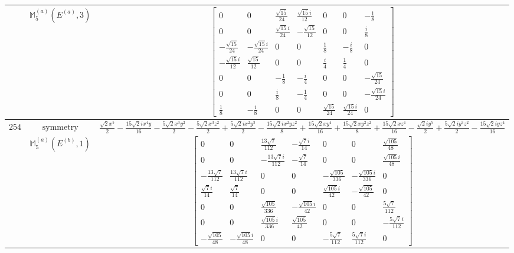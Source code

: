 \documentclass[fleqn,8pt,landscape]{jsarticle}
\begin{document}
\begin{longtable}{ccc}
$  $ & $ \mathbb{M}_{5}^{(a)}(E^{(a)},3) $ & $ \begin{bmatrix} 0 & 0 & \frac{\sqrt{15}}{24} & \frac{\sqrt{15} i}{12} & 0 & 0 & - \frac{1}{8} \\ 0 & 0 & \frac{\sqrt{15} i}{24} & - \frac{\sqrt{15}}{12} & 0 & 0 & \frac{i}{8} \\ - \frac{\sqrt{15}}{24} & - \frac{\sqrt{15} i}{24} & 0 & 0 & \frac{1}{8} & - \frac{i}{8} & 0 \\ - \frac{\sqrt{15} i}{12} & \frac{\sqrt{15}}{12} & 0 & 0 & \frac{i}{4} & \frac{1}{4} & 0 \\ 0 & 0 & - \frac{1}{8} & - \frac{i}{4} & 0 & 0 & - \frac{\sqrt{15}}{24} \\ 0 & 0 & \frac{i}{8} & - \frac{1}{4} & 0 & 0 & - \frac{\sqrt{15} i}{24} \\ \frac{1}{8} & - \frac{i}{8} & 0 & 0 & \frac{\sqrt{15}}{24} & \frac{\sqrt{15} i}{24} & 0 \end{bmatrix} $ \\ \hline
$ 254 $ & $ \text{symmetry} $ & $ \frac{\sqrt{2} x^{5}}{2} - \frac{15 \sqrt{2} i x^{4} y}{16} - \frac{5 \sqrt{2} x^{3} y^{2}}{2} - \frac{5 \sqrt{2} x^{3} z^{2}}{2} + \frac{5 \sqrt{2} i x^{2} y^{3}}{2} - \frac{15 \sqrt{2} i x^{2} y z^{2}}{8} + \frac{15 \sqrt{2} x y^{4}}{16} + \frac{15 \sqrt{2} x y^{2} z^{2}}{8} + \frac{15 \sqrt{2} x z^{4}}{16} - \frac{\sqrt{2} i y^{5}}{2} + \frac{5 \sqrt{2} i y^{3} z^{2}}{2} - \frac{15 \sqrt{2} i y z^{4}}{16} $ \\
$  $ & $ \mathbb{M}_{5}^{(a)}(E^{(b)},1) $ & $ \begin{bmatrix} 0 & 0 & \frac{13 \sqrt{7}}{112} & - \frac{\sqrt{7} i}{14} & 0 & 0 & \frac{\sqrt{105}}{48} \\ 0 & 0 & - \frac{13 \sqrt{7} i}{112} & - \frac{\sqrt{7}}{14} & 0 & 0 & \frac{\sqrt{105} i}{48} \\ - \frac{13 \sqrt{7}}{112} & \frac{13 \sqrt{7} i}{112} & 0 & 0 & - \frac{\sqrt{105}}{336} & - \frac{\sqrt{105} i}{336} & 0 \\ \frac{\sqrt{7} i}{14} & \frac{\sqrt{7}}{14} & 0 & 0 & \frac{\sqrt{105} i}{42} & - \frac{\sqrt{105}}{42} & 0 \\ 0 & 0 & \frac{\sqrt{105}}{336} & - \frac{\sqrt{105} i}{42} & 0 & 0 & \frac{5 \sqrt{7}}{112} \\ 0 & 0 & \frac{\sqrt{105} i}{336} & \frac{\sqrt{105}}{42} & 0 & 0 & - \frac{5 \sqrt{7} i}{112} \\ - \frac{\sqrt{105}}{48} & - \frac{\sqrt{105} i}{48} & 0 & 0 & - \frac{5 \sqrt{7}}{112} & \frac{5 \sqrt{7} i}{112} & 0 \end{bmatrix} $ \\ \hline

\end{longtable}
\end{document}
